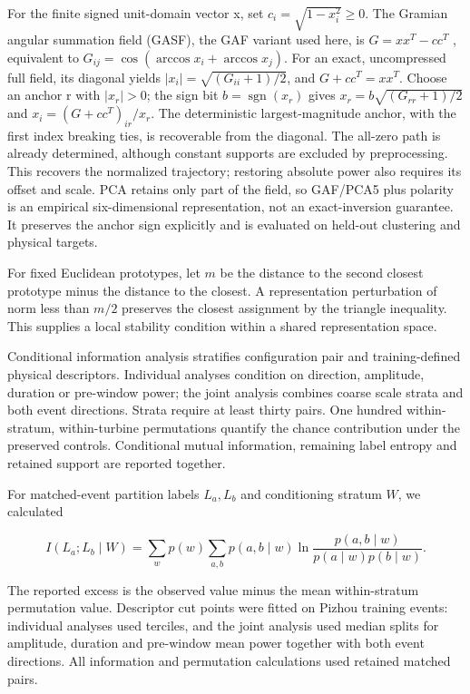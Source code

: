 \documentclass[preprint,12pt]{elsarticle}
\begin{document}
For the finite signed unit-domain vector x, set \(c_i=\sqrt{1-x_i^2}\ge0\). The Gramian angular summation field (GASF), the GAF variant used here, is \(G=xx^T-cc^T\) \citep{wang2015gaf}, equivalent to \(G_{ij}=\cos(\arccos x_i+\arccos x_j)\). For an exact, uncompressed full field, its diagonal yields \(|x_i|=\sqrt{(G_{ii}+1)/2}\), and \(G+cc^T=xx^T\). Choose an anchor r with \(|x_r|>0\); the sign bit \(b=\operatorname{sgn}(x_r)\) gives \(x_r=b\sqrt{(G_{rr}+1)/2}\) and \(x_i=(G+cc^T)_{ir}/x_r\). The deterministic largest-magnitude anchor, with the first index breaking ties, is recoverable from the diagonal. The all-zero path is already determined, although constant supports are excluded by preprocessing. This recovers the normalized trajectory; restoring absolute power also requires its offset and scale. PCA retains only part of the field, so GAF/PCA5 plus polarity is an empirical six-dimensional representation, not an exact-inversion guarantee. It preserves the anchor sign explicitly and is evaluated on held-out clustering and physical targets.

For fixed Euclidean prototypes, let \(m\) be the distance to the second closest prototype minus the distance to the closest. A representation perturbation of norm less than \(m/2\) preserves the closest assignment by the triangle inequality. This supplies a local stability condition within a shared representation space.

Conditional information analysis stratifies configuration pair and training-defined physical descriptors. Individual analyses condition on direction, amplitude, duration or pre-window power; the joint analysis combines coarse scale strata and both event directions. Strata require at least thirty pairs. One hundred within-stratum, within-turbine permutations quantify the chance contribution under the preserved controls. Conditional mutual information, remaining label entropy and retained support are reported together.

For matched-event partition labels \(L_a,L_b\) and conditioning stratum \(W\), we calculated

\[
I(L_a;L_b\mid W)=\sum_w p(w)\sum_{a,b}p(a,b\mid w)
\ln\frac{p(a,b\mid w)}{p(a\mid w)p(b\mid w)}.
\]

The reported excess is the observed value minus the mean within-stratum permutation value. Descriptor cut points were fitted on Pizhou training events: individual analyses used terciles, and the joint analysis used median splits for amplitude, duration and pre-window mean power together with both event directions. All information and permutation calculations used retained matched pairs.
\end{document}
